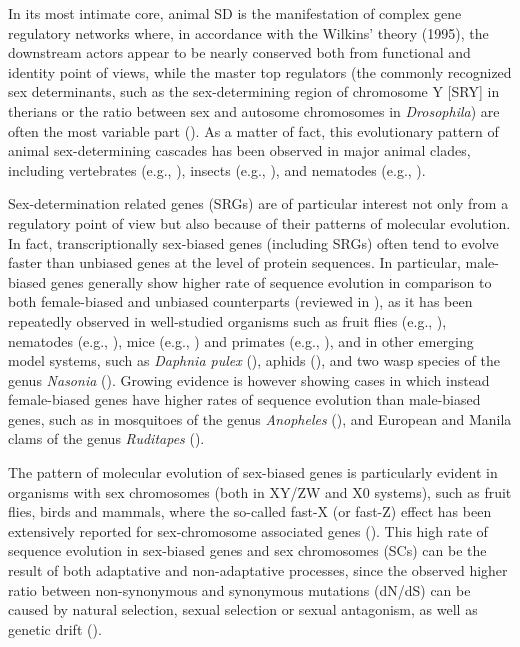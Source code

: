 \documentclass[../main.tex]{subfiles}
\begin{document}
In its most intimate core, animal SD is the manifestation of complex gene regulatory networks where, in accordance with the Wilkins’ theory (1995), the downstream actors appear to be nearly conserved both from functional and identity point of views, while the master top regulators (the commonly recognized sex determinants, such as the sex-determining region of chromosome Y [SRY] in therians or the ratio between sex and autosome chromosomes in \textit{Drosophila}) are often the most variable part (\textbf{\cite{beukeboom2014evolution}}). As a matter of fact, this evolutionary pattern of animal sex-determining cascades has been observed in major animal clades, including vertebrates (e.g., \textbf{\cite{marshall2010homologies}}), insects (e.g., \textbf{\cite{verhulst2010insect}}), and nematodes (e.g., \textbf{\cite{stothard2003sex}}).

Sex-determination related genes (SRGs) are of particular interest not only from a regulatory point of view but also because of their patterns of molecular evolution. In fact, transcriptionally sex-biased genes (including SRGs) often tend to evolve faster than unbiased genes at the level of protein sequences. In particular, male-biased genes generally show higher rate of sequence evolution in comparison to both female-biased and unbiased counterparts (reviewed in \textbf{\cite{parsch2013evolutionary,grath2016sex}}), as it has been repeatedly observed in well-studied organisms such as fruit flies (e.g., \textbf{\cite{meisel2013faster}}), nematodes (e.g., \textbf{\cite{cutter2005sexual}}), mice (e.g., \textbf{\cite{kousathanas2014faster}}) and primates (e.g., \textbf{\cite{khaitovich2005parallel}}), and in other emerging model systems, such as \textit{Daphnia pulex} (\textbf{\cite{eads2007profiling}}), aphids (\textbf{\cite{purandare2014accelerated}}), and two wasp species of the genus \textit{Nasonia} (\textbf{\cite{wang2015nasonia}}). Growing evidence is however showing cases in which instead female-biased genes have higher rates of sequence evolution than male-biased genes, such as in mosquitoes of the genus \textit{Anopheles} (\textbf{\cite{papa2017anopheles}}), and European and Manila clams of the genus \textit{Ruditapes} (\textbf{\cite{ghiselli2018comparative}}).

The pattern of molecular evolution of sex-biased genes is particularly evident in organisms with sex chromosomes (both in XY/ZW and X0 systems), such as fruit flies, birds and mammals, where the so-called fast-X (or fast-Z) effect has been extensively reported for sex-chromosome associated genes (\textbf{\cite{vicoso2006evolutionXchrom,meisel2013faster,mank2007fastZ}}). This high rate of sequence evolution in sex-biased genes and sex chromosomes (SCs) can be the result of both adaptative and non-adaptative processes, since the observed higher ratio between non-synonymous and synonymous mutations (dN/dS) can be caused by natural selection, sexual selection or sexual antagonism, as well as genetic drift (\textbf{\cite{vicoso2006evolutionXchrom,parsch2013evolutionary,meisel2013faster,grath2016sex}}).
\end{document}

